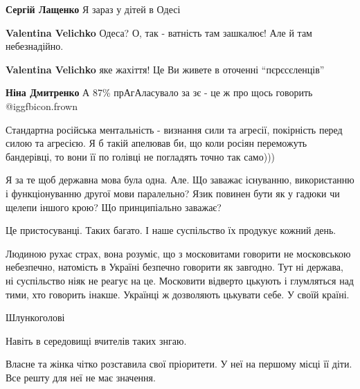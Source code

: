 \begin{itemize}
\begin{itemize}
\textbf{Сергій Лащенко} Я зараз у дітей в Одесі

\textbf{Valentina Velichko} Одеса? О, так - ватність там зашкалює! Але й там небезнадійно.

\textbf{Valentina Velichko} яке жахіття!
Це Ви живете в оточенні \enquote{пєрєсєленців}

\textbf{Ніна Дмитренко} А 87\% прАгАласувало за зє - це ж про щось говорить  @igg{fbicon.frown} 
\end{itemize} %


Стандартна російська ментальність - визнання сили та агресії, покірність перед
силою та агресією. Я б такій апелював би, що коли росіян переможуть бандерівці,
то вони її по голівці не погладять точно так само)))


Я за те щоб державна мова була одна.
Але.
Що заважає існуванню, використанню і функціонуванню другої мови паралельно?
Язик повинен бути як у гадюки чи щелепи іншого крою?
Що принципіально заважає?

Це пристосуванці. Таких багато. І наше суспільство їх продукує кожний день.


Людиною рухає страх, вона розуміє, що з московитами говорити не московською
небезпечно, натомість в Україні безпечно говорити як завгодно. Тут ні держава,
ні суспільство ніяк не реагує на це. Московити відверто цькують і глумляться
над тими, хто говорить інакше. Українці ж дозволяють цькувати себе. У своїй
країні.

Шлункоголові

Навіть в середовищі вчителів таких знгаю.

Власне та жінка чітко розставила свої пріоритети. У неї на першому місці її діти. Все решту для неї не має значення.

\end{itemize} %
